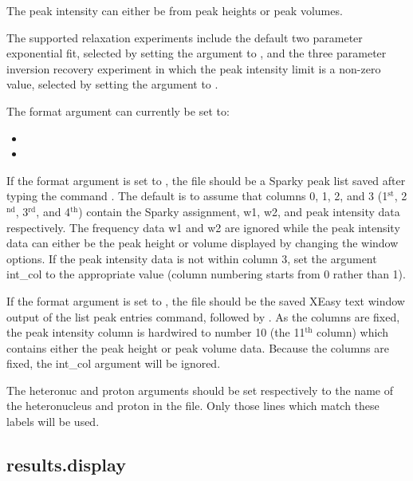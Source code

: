 The peak intensity can either be from peak heights or peak volumes.


The supported relaxation experiments include the default two parameter exponential fit, selected by setting the  argument to , and the three parameter inversion recovery experiment in which the peak intensity limit is a non-zero value, selected by setting the argument to .


The format argument can currently be set to:


\begin{itemize}
\item[]  
\item[]  
\end{itemize}


If the format argument is set to , the file should be a Sparky peak list saved after typing the command .  The default is to assume that columns 0, 1, 2, and 3 (1$^\mathrm{st}$, 2$^\mathrm{nd}$, 3$^\mathrm{rd}$, and 4$^\mathrm{th}$) contain the Sparky assignment, w1, w2, and peak intensity data respectively. The frequency data w1 and w2 are ignored while the peak intensity data can either be the peak height or volume displayed by changing the window options.  If the peak intensity data is not within column 3, set the argument int\_col to the appropriate value (column numbering starts from 0 rather than 1).


If the format argument is set to , the file should be the saved XEasy text window output of the list peak entries command,  followed by .  As the columns are fixed, the peak intensity column is hardwired to number 10 (the 11$^\mathrm{th}$ column) which contains either the peak height or peak volume data.  Because the columns are fixed, the int\_col argument will be ignored.


The heteronuc and proton arguments should be set respectively to the name of the heteronucleus and proton in the file.  Only those lines which match these labels will be used.




\newpage

\subsection{results.display}


